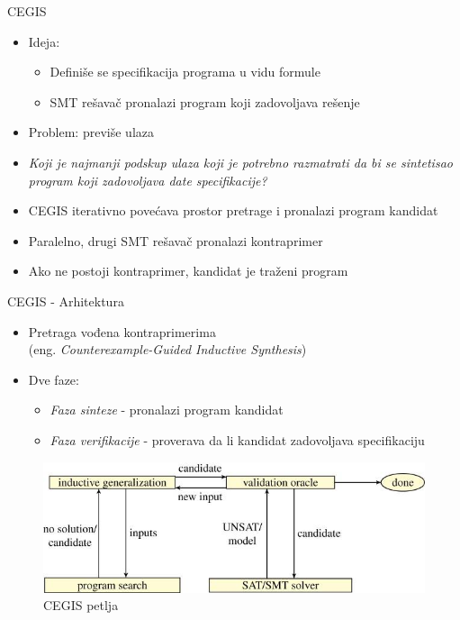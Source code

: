 
\begin{frame}{CEGIS}
    \begin{itemize}
		\item Ideja:
			\begin{itemize}
				\item Definiše se specifikacija programa u vidu formule
		    	\item SMT rešavač pronalazi program koji zadovoljava rešenje
			\end{itemize}    	
    	\item Problem: previše ulaza 
        \item \emph{Koji je najmanji podskup ulaza koji je potrebno razmatrati da bi se sintetisao program koji zadovoljava date specifikacije?}
        \item CEGIS iterativno povećava prostor pretrage i pronalazi program kandidat
        \item Paralelno, drugi SMT rešavač pronalazi kontraprimer 
		\item Ako ne postoji kontraprimer, kandidat je traženi program
    \end{itemize}
\end{frame}

\begin{frame}[fragile]{CEGIS - Arhitektura}
    \begin{itemize}
    	\item Pretraga vođena kontraprimerima \\(eng. \emph{Counterexample-Guided Inductive Synthesis})
        \item Dve faze: 
        	\begin{itemize}
        		\item \emph{Faza sinteze} - pronalazi program kandidat
        		\item \emph{Faza verifikacije} - proverava da li kandidat zadovoljava specifikaciju 
        	\end{itemize}
    \end{itemize}
    \begin{figure}
        \begin{center}
            \includegraphics[scale=0.4]{../resources/cegis.jpeg}
        \end{center}
        \caption{CEGIS petlja}
    \end{figure}
\end{frame}


